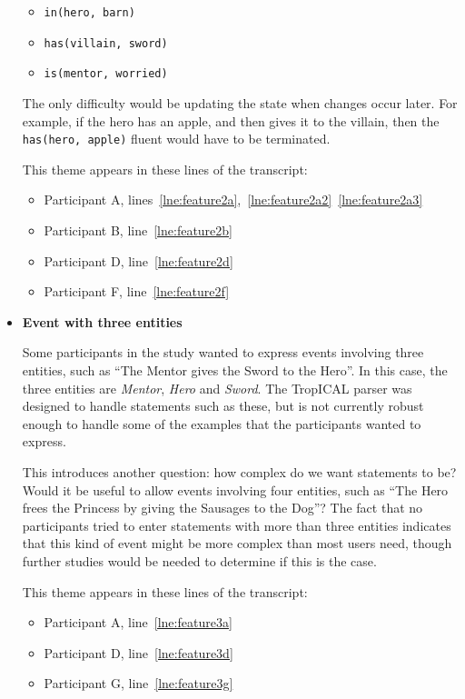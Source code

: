 \documentclass[11pt]{report}
\newcommand{\lref}[1]{\hyperlink{llineno:#1}{\ref*{#1}}}
\begin{document}
\begin{itemize}
  \begin{itemize}
    \item \texttt{in(hero, barn)}
    \item \texttt{has(villain, sword)}
    \item \texttt{is(mentor, worried)}
  \end{itemize}

  The only difficulty would be updating the state when changes occur later. For
  example, if the hero has an apple, and then gives it to the villain, then the
  \texttt{has(hero, apple)} fluent would have to be terminated.

  This theme appears in these lines of the transcript:

\begin{itemize}
\item Participant A, lines~\lref{lne:feature2a},~\lref{lne:feature2a2}~\lref{lne:feature2a3}
\item Participant B, line~\lref{lne:feature2b}
\item Participant D, line~\lref{lne:feature2d}
\item Participant F, line~\lref{lne:feature2f}
\end{itemize}

\item \textbf{Event with three entities}

Some participants in the study wanted to express events involving three
entities, such as ``The Mentor gives the Sword to the Hero''. In this case, the
three entities are \emph{Mentor}, \emph{Hero} and \emph{Sword}. The TropICAL
parser was designed to handle statements such as these, but is not currently
robust enough to handle some of the examples that the participants wanted to express.

This introduces another question: how complex do we want statements to be? Would
it be useful to allow events involving four entities, such as ``The Hero frees
the Princess by giving the Sausages to the Dog''? The fact that no participants
tried to enter statements with more than three entities indicates that this kind
of event might be more complex than most users need, though further studies
would be needed to determine if this is the case.

  This theme appears in these lines of the transcript:

\begin{itemize}
\item Participant A, line~\lref{lne:feature3a}
\item Participant D, line~\lref{lne:feature3d}
\item Participant G, line~\lref{lne:feature3g}
\end{itemize}


\end{itemize}
\end{document}
